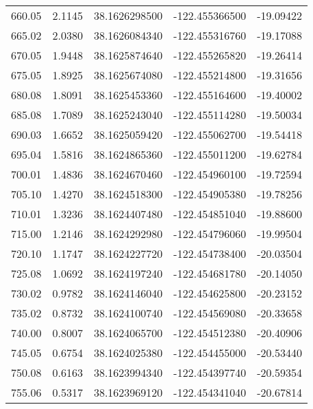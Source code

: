\begin{longtable}{p{2.5cm}p{2.5cm}p{3cm}p{3cm}p{2.5cm}}
       660.05  & 	 2.1145 &               38.1626298500  &   -122.455366500   &	-19.09422 \\
       665.02  & 	 2.0380 &               38.1626084340  &   -122.455316760   &	-19.17088 \\
       670.05  & 	 1.9448 &               38.1625874640  &   -122.455265820   &	-19.26414 \\
       675.05  & 	 1.8925 &               38.1625674080  &   -122.455214800   &	-19.31656 \\
       680.08  & 	 1.8091 &               38.1625453360  &   -122.455164600   &	-19.40002 \\
       685.08  & 	 1.7089 &               38.1625243040  &   -122.455114280   &	-19.50034 \\
       690.03  & 	 1.6652 &               38.1625059420  &   -122.455062700   &	-19.54418 \\
       695.04  & 	 1.5816 &               38.1624865360  &   -122.455011200   &	-19.62784 \\
       700.01  & 	 1.4836 &               38.1624670460  &   -122.454960100   &	-19.72594 \\
       705.10  & 	 1.4270 &               38.1624518300  &   -122.454905380   &	-19.78256 \\
       710.01  & 	 1.3236 &               38.1624407480  &   -122.454851040   &	-19.88600 \\
       715.00  & 	 1.2146 &               38.1624292980  &   -122.454796060   &	-19.99504 \\
       720.10  & 	 1.1747 &               38.1624227720  &   -122.454738400   &	-20.03504 \\
       725.08  & 	 1.0692 &               38.1624197240  &   -122.454681780   &	-20.14050 \\
       730.02  & 	 0.9782 &               38.1624146040  &   -122.454625800   &	-20.23152 \\
       735.02  & 	 0.8732 &               38.1624100740  &   -122.454569080   &	-20.33658 \\
       740.00  & 	 0.8007 &               38.1624065700  &   -122.454512380   &	-20.40906 \\
       745.05  & 	 0.6754 &               38.1624025380  &   -122.454455000   &	-20.53440 \\
       750.08  & 	 0.6163 &               38.1623994340  &   -122.454397740   &	-20.59354 \\
       755.06  & 	 0.5317 &               38.1623969120  &   -122.454341040   &	-20.67814 \\

\end{longtable}
